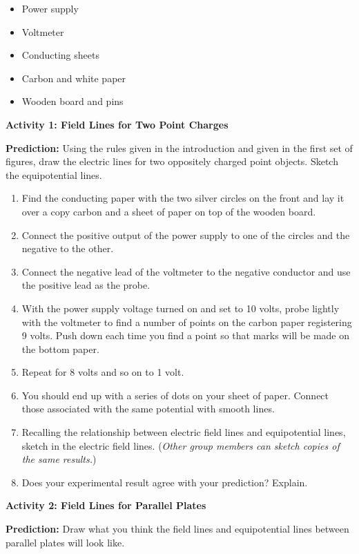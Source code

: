 \begin{itemize}
\item Power supply
\item Voltmeter
\item Conducting sheets
\item Carbon and white paper
\item Wooden board and pins
\end{itemize}
\textbf{Activity 1: Field Lines for Two Point Charges}

\textbf{Prediction:} Using the rules given in the introduction and
given in the first set of figures, draw the electric lines for two
oppositely charged point objects. Sketch the equipotential lines.
\vspace{1in}

\begin{enumerate}
\item Find the conducting paper with the two silver circles on the front
and lay it over a copy carbon and a sheet of paper on top of the wooden
board.
\item Connect the positive output of the power supply to one of the circles
and the negative to the other.
\item Connect the negative lead of the voltmeter to the negative conductor
and use the positive lead as the probe. 
\item With the power supply voltage turned on and set to 10 volts, probe
lightly with the voltmeter to find a number of points on the carbon
paper registering 9 volts. Push down each time you find a point so
that marks will be made on the bottom paper.
\item Repeat for 8 volts and so on to 1 volt.
\item You should end up with a series of dots on your sheet of paper. Connect
those associated with the same potential with smooth lines.
\item Recalling the relationship between electric field lines and equipotential
lines, sketch in the electric field lines. (\emph{Other group members
can sketch copies of the same results.})
\item Does your experimental result agree with your prediction? Explain.\vspace{15mm}

\end{enumerate}
\textbf{Activity 2: Field Lines for Parallel Plates}

\textbf{Prediction:} Draw what you think the field lines and equipotential
lines between parallel plates will look like.
\vspace{1in}

